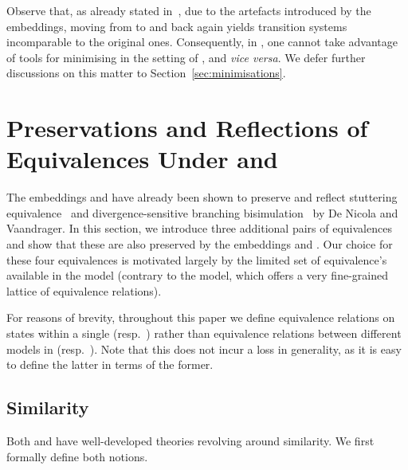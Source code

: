 \documentclass{llncs}
\begin{document}
Observe that, as already stated in~\cite{DBLP:conf/litp/NicolaV90},
due to the artefacts introduced by the embeddings, moving from \LTS
to \KS and back again yields transition systems incomparable to the
original ones. Consequently, in \LTS, one cannot take advantage of tools
for minimising in the setting of \KS, and \emph{vice versa}. We defer
further discussions on this matter to Section~\ref{sec:minimisations}.

\section{Preservations and Reflections of Equivalences Under  and }
\label{Sect:preservations}

The embeddings  and  have already been shown to preserve and
reflect stuttering equivalence~\cite{DBLP:journals/tcs/BrowneCG88} and divergence-sensitive
branching bisimulation~\cite{vanGlabbeek96} by De Nicola and Vaandrager. In this
section, we introduce three additional pairs of equivalences and show
that these are also preserved by the embeddings  and . Our
choice for these four equivalences is motivated largely by the limited
set of equivalence's available in the \KS model (contrary to the \LTS model,
which offers a very fine-grained lattice of equivalence relations).

\begin{remark}
For reasons of brevity, throughout this paper we define equivalence
relations on states within a single \LTS (resp.\ \KS) rather than
equivalence relations between different models in \LTS (resp.\ \KS). Note
that this does not incur a loss in generality, as it is easy to define
the latter in terms of the former.

\end{remark}

\subsection{Similarity}
\label{sec:similarity}

Both \KS and \LTS have well-developed theories revolving around
similarity. We first formally define both notions.
\end{document}
